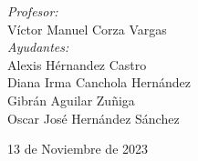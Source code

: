 \begin{titlepage}
    \vspace{10mm}
    \begin{minipage}{0.7\textwidth}
        \begin{flushleft} \large
            \emph{Profesor:}\\
                Víctor Manuel Corza Vargas\\
                \vspace{3mm}
                \emph{Ayudantes:}\\
                Alexis Hérnandez Castro \\
                Diana Irma Canchola Hernández \\
                Gibrán Aguilar Zuñiga \\
                Oscar José Hernández Sánchez 
        \end{flushleft}
    \end{minipage}
    \vspace{6mm}    
    \makeatother
    {\large 13 de Noviembre de 2023}\\[2cm]
    \vfill 
\end{titlepage}